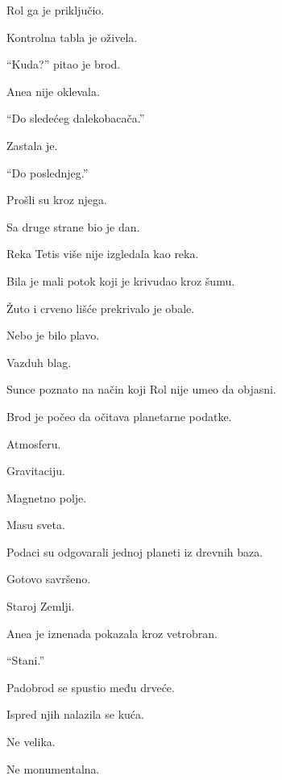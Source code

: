 Rol ga je priključio.

Kontrolna tabla je oživela.

\bigskip

``Kuda?'' pitao je brod.

\bigskip

Anea nije oklevala.

``Do sledećeg dalekobacača.''

Zastala je.

``Do poslednjeg.''

\bigskip

Prošli su kroz njega.

\bigskip

Sa druge strane bio je dan.

\bigskip

Reka Tetis više nije izgledala kao reka.

Bila je mali potok koji je krivudao kroz šumu.

\bigskip

Žuto i crveno lišće prekrivalo je obale.

Nebo je bilo plavo.

Vazduh blag.

Sunce poznato na način koji Rol nije umeo da objasni.

\bigskip

Brod je počeo da očitava planetarne podatke.

Atmosferu.

Gravitaciju.

Magnetno polje.

Masu sveta.

\bigskip

Podaci su odgovarali jednoj planeti iz drevnih baza.

Gotovo savršeno.

\bigskip

Staroj Zemlji.

\bigskip

Anea je iznenada pokazala kroz vetrobran.

``Stani.''

\bigskip

Padobrod se spustio među drveće.

\bigskip

Ispred njih nalazila se kuća.

\bigskip

Ne velika.

Ne monumentalna.

\bigskip

